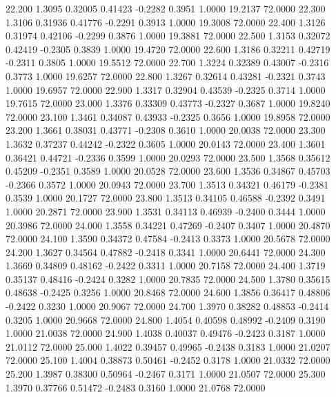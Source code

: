   22.200   1.3095   0.32005   0.41423  -0.2282   0.3951   1.0000  19.2137  72.0000
  22.300   1.3106   0.31936   0.41776  -0.2291   0.3913   1.0000  19.3008  72.0000
  22.400   1.3126   0.31974   0.42106  -0.2299   0.3876   1.0000  19.3881  72.0000
  22.500   1.3153   0.32072   0.42419  -0.2305   0.3839   1.0000  19.4720  72.0000
  22.600   1.3186   0.32211   0.42719  -0.2311   0.3805   1.0000  19.5512  72.0000
  22.700   1.3224   0.32389   0.43007  -0.2316   0.3773   1.0000  19.6257  72.0000
  22.800   1.3267   0.32614   0.43281  -0.2321   0.3743   1.0000  19.6957  72.0000
  22.900   1.3317   0.32904   0.43539  -0.2325   0.3714   1.0000  19.7615  72.0000
  23.000   1.3376   0.33309   0.43773  -0.2327   0.3687   1.0000  19.8240  72.0000
  23.100   1.3461   0.34087   0.43933  -0.2325   0.3656   1.0000  19.8958  72.0000
  23.200   1.3661   0.38031   0.43771  -0.2308   0.3610   1.0000  20.0038  72.0000
  23.300   1.3632   0.37237   0.44242  -0.2322   0.3605   1.0000  20.0143  72.0000
  23.400   1.3601   0.36421   0.44721  -0.2336   0.3599   1.0000  20.0293  72.0000
  23.500   1.3568   0.35612   0.45209  -0.2351   0.3589   1.0000  20.0528  72.0000
  23.600   1.3536   0.34867   0.45703  -0.2366   0.3572   1.0000  20.0943  72.0000
  23.700   1.3513   0.34321   0.46179  -0.2381   0.3539   1.0000  20.1727  72.0000
  23.800   1.3513   0.34105   0.46588  -0.2392   0.3491   1.0000  20.2871  72.0000
  23.900   1.3531   0.34113   0.46939  -0.2400   0.3444   1.0000  20.3986  72.0000
  24.000   1.3558   0.34221   0.47269  -0.2407   0.3407   1.0000  20.4870  72.0000
  24.100   1.3590   0.34372   0.47584  -0.2413   0.3373   1.0000  20.5678  72.0000
  24.200   1.3627   0.34564   0.47882  -0.2418   0.3341   1.0000  20.6441  72.0000
  24.300   1.3669   0.34809   0.48162  -0.2422   0.3311   1.0000  20.7158  72.0000
  24.400   1.3719   0.35137   0.48416  -0.2424   0.3282   1.0000  20.7835  72.0000
  24.500   1.3780   0.35615   0.48638  -0.2425   0.3256   1.0000  20.8468  72.0000
  24.600   1.3856   0.36417   0.48806  -0.2422   0.3230   1.0000  20.9067  72.0000
  24.700   1.3970   0.38282   0.48853  -0.2414   0.3205   1.0000  20.9668  72.0000
  24.800   1.4054   0.40598   0.48992  -0.2409   0.3190   1.0000  21.0038  72.0000
  24.900   1.4038   0.40037   0.49476  -0.2423   0.3187   1.0000  21.0112  72.0000
  25.000   1.4022   0.39457   0.49965  -0.2438   0.3183   1.0000  21.0207  72.0000
  25.100   1.4004   0.38873   0.50461  -0.2452   0.3178   1.0000  21.0332  72.0000
  25.200   1.3987   0.38300   0.50964  -0.2467   0.3171   1.0000  21.0507  72.0000
  25.300   1.3970   0.37766   0.51472  -0.2483   0.3160   1.0000  21.0768  72.0000
